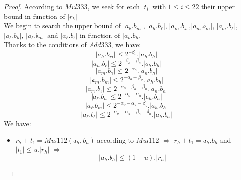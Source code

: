 \begin{proof} \color{-yellow} 
According to $Mul333$, we seek for each $\lvert t_i \rvert $ with $1\le i \le 22$ their upper bound in function of $\lvert r_h \rvert$\\
We begin to search the upper bound of $\lvert a_h.b_m \rvert$, $\lvert a_h.b_{\ell} \rvert$, $\lvert a_m.b_h \rvert$,$\lvert a_m.b_m \rvert$, $\lvert a_m.b_{\ell} \rvert$, $\lvert a_{\ell}.b_h \rvert$, $\lvert a_{\ell}.b_m \rvert$ and $\lvert a_{\ell}.b_{\ell} \rvert$ in function of $\lvert a_h.b_h$.\\
Thanks to the conditions of $Add333$, we have:
$$\lvert a_h.b_m \rvert \le 2^{-\beta_o}. \lvert a_h.b_h \rvert $$
$$\lvert a_h.b_{\ell} \rvert \le 2^{-\beta_o -\beta_u}. \lvert a_h.b_h \rvert $$
$$\lvert a_m.b_h \rvert \le 2^{-\alpha_o}. \lvert a_h.b_h \rvert $$
$$\lvert a_m.b_m \rvert \le 2^{-\alpha_o -\beta_o}. \lvert a_h.b_h \rvert $$
$$\lvert a_m.b_{\ell} \rvert \le 2^{-\alpha_o -\beta_o -\beta_u}. \lvert a_h.b_h \rvert $$
$$\lvert a_{\ell}.b_h \rvert \le 2^{-\alpha_o - \alpha_u}. \lvert a_h.b_h \rvert $$
$$\lvert a_{\ell}.b_m \rvert \le 2^{-\alpha_o - \alpha_u -\beta_o}. \lvert a_h.b_h \rvert $$
$$\lvert a_{\ell}.b_{\ell} \rvert \le 2^{-\alpha_o - \alpha_u -\beta_o - \beta_u}. \lvert a_h.b_h \rvert $$
We have:
\begin{itemize}
    \item  $r_h + t_1 = Mul112(a_h,b_h)$ according to $Mul112$ $\Rightarrow$ $r_h + t_1 = a_h.b_h$ and $\lvert t_1 \rvert \le u. \lvert r_h \rvert$ $\Rightarrow$
$$\lvert a_h.b_h \rvert \le (1+u).\lvert r_h \rvert$$


\end{itemize}
\end{proof}
